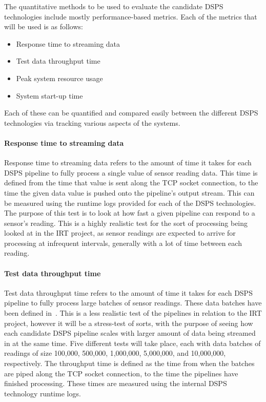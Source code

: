The quantitative methods to be used to evaluate the candidate DSPS technologies include mostly performance-based
metrics. Each of the metrics that will be used is as follows:

\begin{itemize}
  \item Response time to streaming data
  \item Test data throughput time
  \item Peak system resource usage
  \item System start-up time
\end{itemize}

Each of these can be quantified and compared easily between the different DSPS technologies via tracking various aspects
of the systems.

\paragraph{Response time to streaming data}

Response time to streaming data refers to the amount of time it takes for each DSPS pipeline to fully process a single
value of sensor reading data. This time is defined from the time that value is sent along the TCP socket connection, to the time
the given data value is pushed onto the pipeline's output stream. This can be measured using the runtime logs provided
for each of the DSPS technologies. The purpose of this test is to look at how fast a given pipeline can respond to a
sensor's reading. This is a highly realistic test for the sort of processing being looked at in the IRT project, as
sensor readings are expected to arrive for processing at infrequent intervals, generally with a lot of time between
each reading.

\paragraph{Test data throughput time}

Test data throughput time refers to the amount of time it takes for each DSPS pipeline to fully process large batches
of sensor readings. These data batches have been defined in~. This is a less realistic
test of the pipelines in relation to the IRT project, however it will be a stress-test of sorts, with the purpose of
seeing how each candidate DSPS pipeline scales with larger amount of data being streamed in at the same time. Five different
tests will take place, each with data batches of readings of size 100,\@000, 500,\@000, 1,\@000,\@000, 5,\@000,\@000,
and 10,\@000,\@000, respectively. The throughput time is defined as the time from when the batches are piped along the TCP
socket connection, to the time the pipelines have finished processing. These times are measured using the internal DSPS
technology runtime logs.

